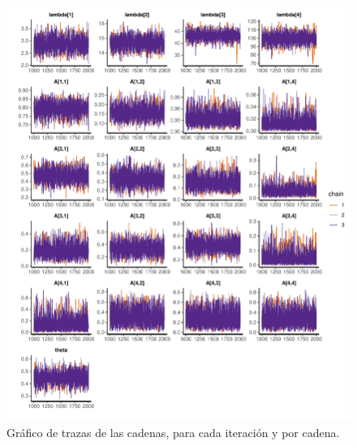 \documentclass[a4paper]{article}\usepackage[]{graphicx}\usepackage[]{color}
\makeatletter
\def\maxwidth{ %
  \ifdim\Gin@nat@width>\linewidth
    \linewidth
  \else
    \Gin@nat@width
  \fi
}
\newenvironment{knitrout}{}{} %
\makeatother
\begin{document}
\begin{knitrout}
\color{fgcolor}\begin{figure}
\includegraphics[width=\maxwidth]{figure/unnamed-chunk-51-1} \caption[Gráfico de trazas de las cadenas, para cada iteración y por cadena]{Gráfico de trazas de las cadenas, para cada iteración y por cadena.}\label{fig:unnamed-chunk-51}
\end{figure}


\end{knitrout}
\end{document}

